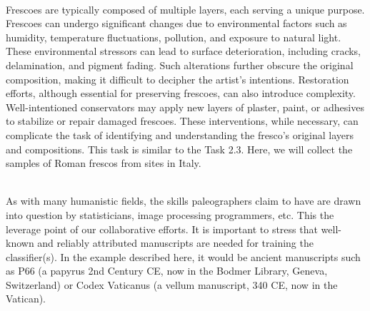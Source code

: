 \\
Frescoes are typically composed of multiple layers, each serving a unique purpose. Frescoes can undergo significant changes due to environmental factors such as humidity, temperature fluctuations, pollution, and exposure to natural light. These environmental stressors can lead to surface deterioration, including cracks, delamination, and pigment fading. Such alterations further obscure the original composition, making it difficult to decipher the artist’s intentions. Restoration efforts, although essential for preserving frescoes, can also introduce complexity. Well-intentioned conservators may apply new layers of plaster, paint, or adhesives to stabilize or repair damaged frescoes. These interventions, while necessary, can complicate the task of identifying and understanding the fresco’s original layers and compositions. This task is similar to the Task 2.3. Here, we will collect the samples of Roman frescos from sites in Italy.

\\
As with many humanistic fields, the skills paleographers claim to have are drawn into question by statisticians, image processing programmers, etc. This the leverage point of our collaborative efforts. It is important to stress that well-known and reliably attributed manuscripts are needed for training the classifier(s). In the example described here, it would be ancient manuscripts such as P66 (a papyrus 2nd Century CE, now in the Bodmer Library, Geneva, Switzerland) or Codex Vaticanus (a vellum manuscript, 340 CE, now in the Vatican).


